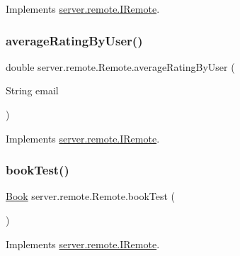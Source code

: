 Implements \hyperlink{interfaceserver_1_1remote_1_1_i_remote_a4a53942c94debc835f1817b2753722de}{server.\+remote.\+I\+Remote}.

\mbox{\label{classserver_1_1remote_1_1_remote_a67fc7aeeb889a80cda6e1a5f83858c2a}} 
\subsubsection{\texorpdfstring{average\+Rating\+By\+User()}{averageRatingByUser()}}
{\footnotesize\ttfamily double server.\+remote.\+Remote.\+average\+Rating\+By\+User (\begin{DoxyParamCaption}\item[{String}]{email }\end{DoxyParamCaption})}



Implements \hyperlink{interfaceserver_1_1remote_1_1_i_remote_a11c915f0c22728be1898d46a78ac92cf}{server.\+remote.\+I\+Remote}.

\mbox{\label{classserver_1_1remote_1_1_remote_a38bce20fa59064fe8d970164d6155435}} 
\subsubsection{\texorpdfstring{book\+Test()}{bookTest()}}
{\footnotesize\ttfamily \hyperlink{classserver_1_1data_1_1_book}{Book} server.\+remote.\+Remote.\+book\+Test (\begin{DoxyParamCaption}{ }\end{DoxyParamCaption})}



Implements \hyperlink{interfaceserver_1_1remote_1_1_i_remote_a7d561f9f92fb53177f2d3e49e445148a}{server.\+remote.\+I\+Remote}.

\mbox{\label{classserver_1_1remote_1_1_remote_af5d1abb1730b8db14ab9dd476df158d8}} 
